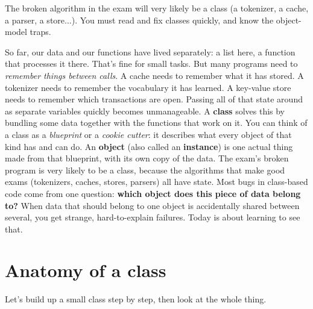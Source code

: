 \documentclass[10pt,a4paper]{article}
\begin{document}
\makecover
\setcounter{page}{2}
\makefrontmatter
\begin{goalbox}
The broken algorithm in the exam will very likely be a class (a tokenizer, a cache, a parser, a store...). You must read and fix classes quickly, and know the object-model traps.
\end{goalbox}
\vspace{2pt}
So far, our data and our functions have lived separately: a list here, a function that processes it there. That’s fine for small tasks. But many programs need to \emph{remember things between calls}. A cache needs to remember what it has stored. A tokenizer needs to remember the vocabulary it has learned. A key-value store needs to remember which transactions are open. Passing all of that state around as separate variables quickly becomes unmanageable.
A \textbf{class} solves this by bundling some data together with the functions that work on it. You can think of a class as a \emph{blueprint} or a \emph{cookie cutter}: it describes what every object of that kind has and can do. An \textbf{object} (also called an \textbf{instance}) is one actual thing made from that blueprint, with its own copy of the data.
The exam’s broken program is very likely to be a class, because the algorithms that make good exams (tokenizers, caches, stores, parsers) all have state. Most bugs in class-based code come from one question: \textbf{which object does this piece of data belong to?} When data that should belong to one object is accidentally shared between several, you get strange, hard-to-explain failures. Today is about learning to see that.
\setcounter{section}{0}
\section{Anatomy of a class}
Let’s build up a small class step by step, then look at the whole thing.
\end{document}
